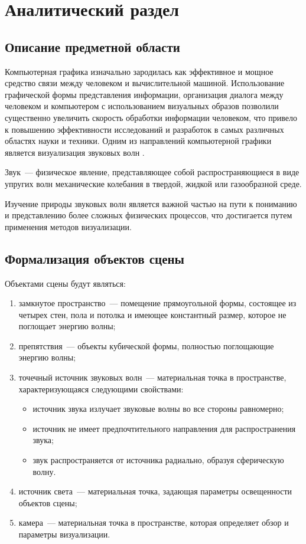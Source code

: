 \chapter{Аналитический раздел}

\section{Описание предметной области}

Компьютерная графика изначально зародилась как эффективное и мощное средство связи между человеком и вычислительной машиной.
Использование графической формы представления информации, организация диалога между человеком и компьютером с использованием визуальных образов позволили существенно увеличить скорость обработки информации человеком, что привело к повышению эффективности исследований и разработок в самых различных областях науки и техники.
Одним из направлений компьютерной графики является визуализация звуковых волн \cite{baseGraph1, baseGraph2}.

Звук~--- физическое явление, представляющее собой распространяющиеся в виде упругих волн механические колебания в твердой, жидкой или газообразной среде.

Изучение природы звуковых волн является важной частью на пути к пониманию и представлению более сложных физических процессов, что достигается путем применения методов визуализации.

\clearpage

\section{Формализация объектов сцены}

Объектами сцены будут являться:
\begin{enumerate}
	\item замкнутое пространство~--- помещение прямоугольной формы, состоящее из четырех стен, пола и потолка и имеющее константный размер, которое не поглощает энергию волны;
	\item препятствия~--- объекты кубической формы, полностью поглощающие энергию волны;
	\item точечный источник звуковых волн~--- материальная точка в пространстве, характеризующаяся следующими свойствами:
	\begin{itemize}
		\item источник звука излучает звуковые волны во все стороны равномерно;
		\item источник не имеет предпочтительного направления для распространения звука;
		\item звук распространяется от источника радиально, образуя сферическую волну.
	\end{itemize}
	\item источник света~--- материальная точка, задающая параметры освещенности объектов сцены;
	\item камера~--- материальная точка в пространстве, которая определяет обзор и параметры визуализации.
\end{enumerate}

